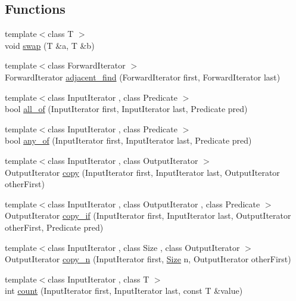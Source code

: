 \subsection*{Functions}
\begin{DoxyCompactItemize}
\item 
{\footnotesize template$<$class T $>$ }\\void \hyperlink{namespaceprism_a6430516ab4f2e2a7f43323acb6b559d8}{swap} (T \&a, T \&b)
\item 
{\footnotesize template$<$class Forward\+Iterator $>$ }\\Forward\+Iterator \hyperlink{namespaceprism_a82052418345794a13044c15d8e32dd89}{adjacent\+\_\+find} (Forward\+Iterator first, Forward\+Iterator last)
\item 
{\footnotesize template$<$class Input\+Iterator , class Predicate $>$ }\\bool \hyperlink{namespaceprism_aba366b328f3b6161e6115c16b7153c6d}{all\+\_\+of} (Input\+Iterator first, Input\+Iterator last, Predicate pred)
\item 
{\footnotesize template$<$class Input\+Iterator , class Predicate $>$ }\\bool \hyperlink{namespaceprism_a5d0e3ddb9f698759635572f1220ec0ca}{any\+\_\+of} (Input\+Iterator first, Input\+Iterator last, Predicate pred)
\item 
{\footnotesize template$<$class Input\+Iterator , class Output\+Iterator $>$ }\\Output\+Iterator \hyperlink{namespaceprism_ae776f4cd825f79e7af1cf6ee1d90a209}{copy} (Input\+Iterator first, Input\+Iterator last, Output\+Iterator other\+First)
\item 
{\footnotesize template$<$class Input\+Iterator , class Output\+Iterator , class Predicate $>$ }\\Output\+Iterator \hyperlink{namespaceprism_afbed55ae6769c2d88c125aedc2f3846e}{copy\+\_\+if} (Input\+Iterator first, Input\+Iterator last, Output\+Iterator other\+First, Predicate pred)
\item 
{\footnotesize template$<$class Input\+Iterator , class Size , class Output\+Iterator $>$ }\\Output\+Iterator \hyperlink{namespaceprism_af907f3f5637d4ec056e9b833b6272953}{copy\+\_\+n} (Input\+Iterator first, \hyperlink{classprism_1_1_size}{Size} n, Output\+Iterator other\+First)
\item 
{\footnotesize template$<$class Input\+Iterator , class T $>$ }\\int \hyperlink{namespaceprism_a024117fc3639cdf6598509edf22f034a}{count} (Input\+Iterator first, Input\+Iterator last, const T \&value)

\end{DoxyCompactItemize}
